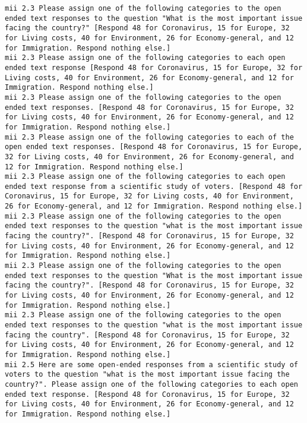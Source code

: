 \begin{lstlisting}[label=lst:promptvariants]
mii	2.3	Please assign one of the following categories to the open ended text responses to the question "What is the most important issue facing the country?" [Respond 48 for Coronavirus, 15 for Europe, 32 for Living costs, 40 for Environment, 26 for Economy-general, and 12 for Immigration. Respond nothing else.]
mii	2.3	Please assign one of the following categories to each open ended text response [Respond 48 for Coronavirus, 15 for Europe, 32 for Living costs, 40 for Environment, 26 for Economy-general, and 12 for Immigration. Respond nothing else.]
mii	2.3	Please assign one of the following categories to the open ended text responses. [Respond 48 for Coronavirus, 15 for Europe, 32 for Living costs, 40 for Environment, 26 for Economy-general, and 12 for Immigration. Respond nothing else.]
mii	2.3	Please assign one of the following categories to each of the open ended text responses. [Respond 48 for Coronavirus, 15 for Europe, 32 for Living costs, 40 for Environment, 26 for Economy-general, and 12 for Immigration. Respond nothing else.]
mii	2.3	Please assign one of the following categories to each open ended text response from a scientific study of voters. [Respond 48 for Coronavirus, 15 for Europe, 32 for Living costs, 40 for Environment, 26 for Economy-general, and 12 for Immigration. Respond nothing else.]
mii	2.3	Please assign one of the following categories to the open ended text responses to the question "what is the most important issue facing the country?". [Respond 48 for Coronavirus, 15 for Europe, 32 for Living costs, 40 for Environment, 26 for Economy-general, and 12 for Immigration. Respond nothing else.]
mii	2.3	Please assign one of the following categories to the open ended text responses to the question "What is the most important issue facing the country?". [Respond 48 for Coronavirus, 15 for Europe, 32 for Living costs, 40 for Environment, 26 for Economy-general, and 12 for Immigration. Respond nothing else.]
mii	2.3	Please assign one of the following categories to the open ended text responses to the question "what is the most important issue facing the country". [Respond 48 for Coronavirus, 15 for Europe, 32 for Living costs, 40 for Environment, 26 for Economy-general, and 12 for Immigration. Respond nothing else.]
mii	2.5	Here are some open-ended responses from a scientific study of voters to the question "what is the most important issue facing the country?". Please assign one of the following categories to each open ended text response. [Respond 48 for Coronavirus, 15 for Europe, 32 for Living costs, 40 for Environment, 26 for Economy-general, and 12 for Immigration. Respond nothing else.]

\end{lstlisting}
